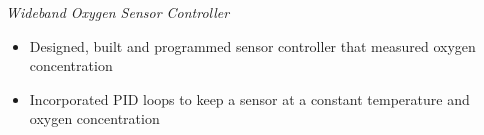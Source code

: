 \documentclass[line,mmmargin]{res}
\begin{document}
\begin{resume}
	\vspace{-10pt}

	{\sl Wideband Oxygen Sensor Controller}
		\begin{itemize} \itemsep -2pt
			\item Designed, built and programmed sensor controller that measured oxygen concentration
			\item Incorporated PID loops to keep a sensor at a constant temperature and oxygen concentration
		\end{itemize}


\end{resume}
\end{document}
